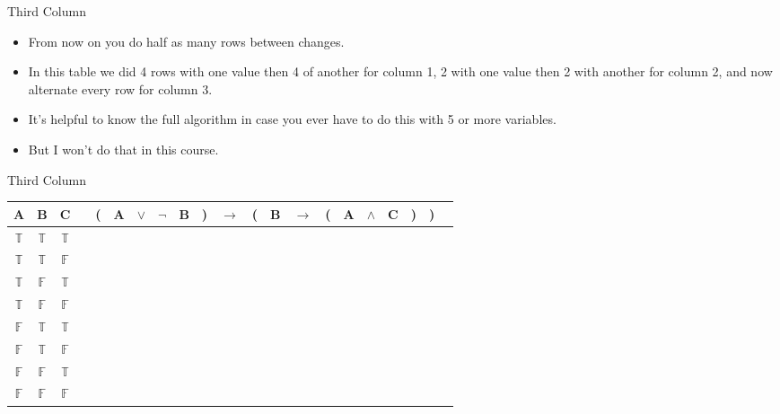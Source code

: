 \documentclass[
  ignorenonframetext,
]{beamer}
\providecommand{\tightlist}{%
  \setlength{\itemsep}{0pt}\setlength{\parskip}{0pt}}
\renewcommand{\,}{\text{, }}
\def\True{\mathbb{T}}
\def\False{\mathbb{F}}
\begin{document}
\begin{frame}{Third Column}
\protect\hypertarget{third-column}{}

\begin{itemize}
\tightlist
\item
  From now on you do half as many rows between changes.
\item
  In this table we did 4 rows with one value then 4 of another for
  column 1, 2 with one value then 2 with another for column 2, and now
  alternate every row for column 3.
\item
  It's helpful to know the full algorithm in case you ever have to do
  this with 5 or more variables.
\item
  But I won't do that in this course.
\end{itemize}

\end{frame}

\begin{frame}{Third Column}
\protect\hypertarget{third-column-1}{}

\begin{center}
\begin{tabular}{@{ }c@{ }@{ }c@{ }@{ }c | c@{ }@{}c@{}@{ }c@{ }@{ }c@{ }@{ }c@{ }@{ }c@{ }@{}c@{}@{ }c@{ }@{}c@{}@{ }c@{ }@{ }c@{ }@{}c@{}@{ }c@{ }@{ }c@{ }@{ }c@{ }@{}c@{}@{}c@{}@{ }c}
A & B & C &  & ( & A & $\lor$ & $\neg$ & B & ) & $\rightarrow$ & ( & B & $\rightarrow$ & ( & A & $\wedge$ & C & ) & ) & \\
\hline 
 $\True$ & $\True$ & $\True$ &  & \\
 $\True$ & $\True$ & $\False$ &  & \\
 $\True$ & $\False$ & $\True$ &  & \\
 $\True$ & $\False$ & $\False$ &  &  \\
 $\False$ & $\True$ & $\True$ &  & \\
 $\False$ & $\True$ & $\False$ &  & \\
 $\False$ & $\False$ & $\True$ &  & \\
 $\False$ & $\False$ & $\False$ &  & \\
\end{tabular}
\end{center}

\end{frame}
\end{document}
